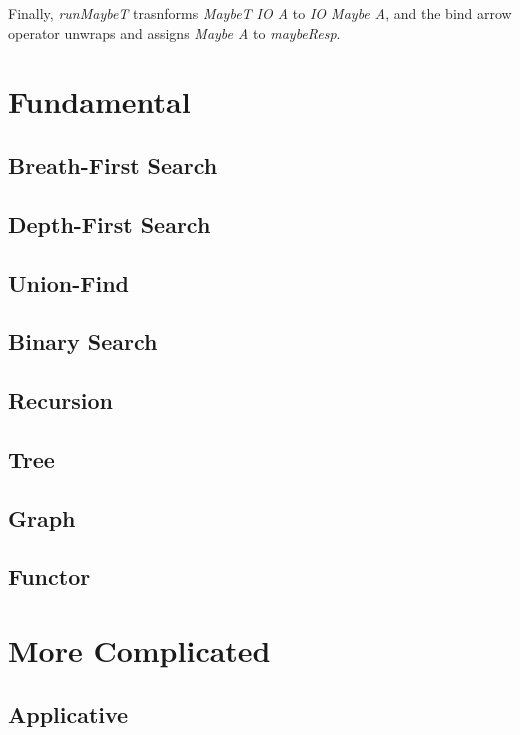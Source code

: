 \documentclass{kdp}
\begin{document}
Finally, \textit{runMaybeT} trasnforms \textit{MaybeT IO A} to \textit{IO Maybe
A}, and the bind arrow operator unwraps and assigns \textit{Maybe A} to 
\textit{maybeResp}.

\part{Fundamental}

\chapter{Breath-First Search}



\chapter{Depth-First Search}



\chapter{Union-Find}

\chapter{Binary Search}

\chapter{Recursion}

\chapter{Tree}

\chapter{Graph}

\chapter{Functor}

\part{More Complicated}

\chapter{Applicative}
\end{document}
